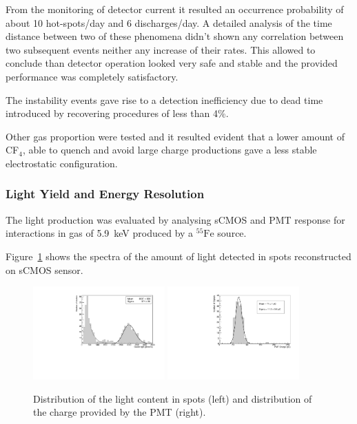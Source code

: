 \documentclass[physics,article,submit,moreauthors,pdftex]{Definitions/mdpi}
\newcommand{\fe}{\ensuremath{^{55}\textrm{Fe}}\xspace}
\begin{document}
From the monitoring of detector current it resulted an occurrence probability of about 10 hot-spots/day and 6 discharges/day.
A detailed analysis of the time distance between two of these phenomena didn't shown any correlation between two subsequent events neither any increase of their rates. This allowed to conclude than
detector operation looked very safe and stable and the provided performance was completely satisfactory. 

The instability events gave rise to a detection inefficiency due to dead time introduced by recovering procedures of less than 4\%.

Other gas proportion were tested and it resulted evident that a lower amount of CF$_4$, able to quench and avoid large charge productions gave a less stable electrostatic configuration. 

\subsubsection{Light Yield and Energy Resolution}

The light production was evaluated by analysing sCMOS and PMT response for interactions in gas of 5.9~keV produced by a \fe source.

Figure~\ref{fig:light} shows the spectra of the amount of light detected in spots reconstructed on sCMOS sensor.

\begin{figure}[ht]
\centering
\includegraphics[width=0.45\textwidth]{DB_Integral_6040.pdf}
\includegraphics[width=0.45\textwidth]{newlightCharge_Run1834_Mix60-40.pdf}
\caption{Distribution of the light content in spots (left) and distribution of the charge provided by the PMT (right).} 
\label{fig:light}
\end{figure}
\end{document}

